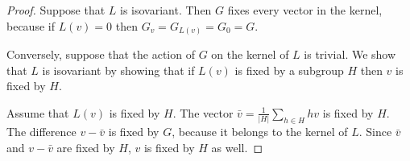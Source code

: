 \documentclass[11pt]{amsart}
\theoremstyle{definition}
\numberwithin{equation}{section}
\numberwithin{figure}{section}
\begin{document}
\begin{proof}
Suppose that $L$ is isovariant. Then $G$ fixes every vector in the kernel, because if $L(v)=0$ then $G_v=G_{L(v)}=G_0=G$. 

Conversely, suppose that the action of $G$ on the kernel of $L$ is trivial. We show that $L$ is isovariant by showing that if $L(v)$ is fixed by a subgroup $H$ then $v$ is fixed by $H$. 

Assume that $L(v)$ is fixed by $H$. The vector $\bar v=\frac{1}{|H|}\sum_{h\in H}hv$ is fixed by $H$. The difference $v-\bar v$ is fixed by $G$, because it belongs to the kernel of $L$. Since $\bar v$ and $v-\bar v$ are fixed by $H$, $v$ is fixed by $H$ as well. %
\end{proof}
\end{document}
